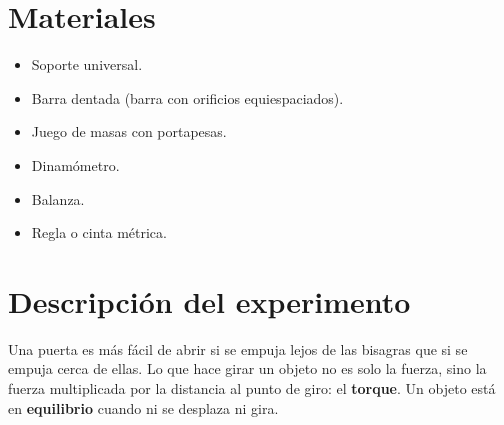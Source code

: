 \documentclass[11pt, letterpaper]{article}
\begin{document}
	\section{Materiales}
	\begin{itemize}
		\item Soporte universal.
		\item Barra dentada (barra con orificios equiespaciados).
		\item Juego de masas con portapesas.
		\item Dinamómetro.
		\item Balanza.
		\item Regla o cinta métrica.
	\end{itemize}
	
	\section{Descripción del experimento}
	
	Una puerta es más fácil de abrir si se empuja lejos de las bisagras que si
	se empuja cerca de ellas. Lo que hace girar un objeto no es solo la fuerza,
	sino la fuerza multiplicada por la distancia al punto de giro: el
	\textbf{torque}. Un objeto está en \textbf{equilibrio} cuando ni se
	desplaza ni gira.
	
\end{document}
